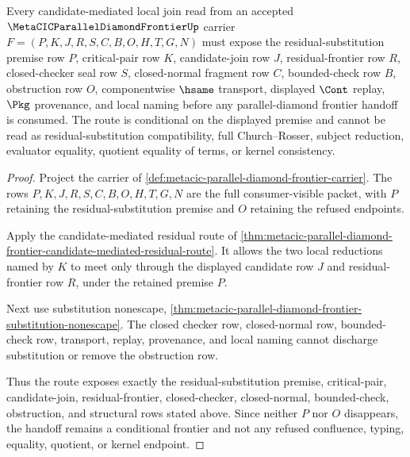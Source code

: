 \begin{theorem}
\label{thm:metacic-parallel-diamond-residual-substitution-route}
Every candidate-mediated local join read from an accepted $\MetaCICParallelDiamondFrontierUp$ carrier $F=(P,K,J,R,S,C,B,O,H,T,G,N)$ must expose the residual-substitution premise row $P$, critical-pair row $K$, candidate-join row $J$, residual-frontier row $R$, closed-checker seal row $S$, closed-normal fragment row $C$, bounded-check row $B$, obstruction row $O$, componentwise $\hsame$ transport, displayed $\Cont$ replay, $\Pkg$ provenance, and local naming before any parallel-diamond frontier handoff is consumed. The route is conditional on the displayed premise and cannot be read as residual-substitution compatibility, full Church--Rosser, subject reduction, evaluator equality, quotient equality of terms, or kernel consistency.
\end{theorem}
\begin{proof}
Project the carrier of \autoref{def:metacic-parallel-diamond-frontier-carrier}. The rows $P,K,J,R,S,C,B,O,H,T,G,N$ are the full consumer-visible packet, with $P$ retaining the residual-substitution premise and $O$ retaining the refused endpoints.

Apply the candidate-mediated residual route of \autoref{thm:metacic-parallel-diamond-frontier-candidate-mediated-residual-route}. It allows the two local reductions named by $K$ to meet only through the displayed candidate row $J$ and residual-frontier row $R$, under the retained premise $P$.

Next use substitution nonescape, \autoref{thm:metacic-parallel-diamond-frontier-substitution-nonescape}. The closed checker row, closed-normal row, bounded-check row, transport, replay, provenance, and local naming cannot discharge substitution or remove the obstruction row.

Thus the route exposes exactly the residual-substitution premise, critical-pair, candidate-join, residual-frontier, closed-checker, closed-normal, bounded-check, obstruction, and structural rows stated above. Since neither $P$ nor $O$ disappears, the handoff remains a conditional frontier and not any refused confluence, typing, equality, quotient, or kernel endpoint.
\end{proof}

